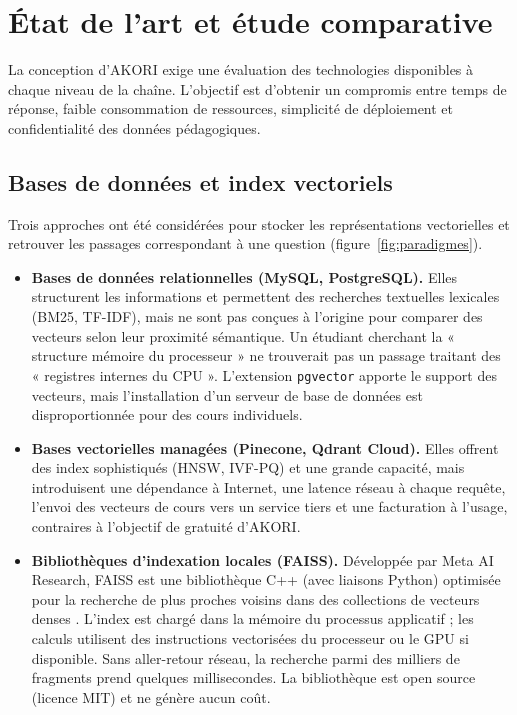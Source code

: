 \documentclass[12pt,a4paper,oneside]{report}
\begin{document}
\section{État de l'art et étude comparative}

La conception d'AKORI exige une évaluation des technologies disponibles à chaque niveau de la chaîne. L'objectif est d'obtenir un compromis entre temps de réponse, faible consommation de ressources, simplicité de déploiement et confidentialité des données pédagogiques.

\subsection{Bases de données et index vectoriels}

Trois approches ont été considérées pour stocker les représentations vectorielles et retrouver les passages correspondant à une question (figure~\ref{fig:paradigmes}).

\begin{itemize}
  \item \textbf{Bases de données relationnelles (MySQL, PostgreSQL).} Elles structurent les informations et permettent des recherches textuelles lexicales (BM25, TF-IDF), mais ne sont pas conçues à l'origine pour comparer des vecteurs selon leur proximité sémantique. Un étudiant cherchant la « structure mémoire du processeur » ne trouverait pas un passage traitant des « registres internes du CPU ». L'extension \texttt{pgvector} apporte le support des vecteurs, mais l'installation d'un serveur de base de données est disproportionnée pour des cours individuels.
  \item \textbf{Bases vectorielles managées (Pinecone, Qdrant Cloud).} Elles offrent des index sophistiqués (HNSW, IVF-PQ) et une grande capacité, mais introduisent une dépendance à Internet, une latence réseau à chaque requête, l'envoi des vecteurs de cours vers un service tiers et une facturation à l'usage, contraires à l'objectif de gratuité d'AKORI.
  \item \textbf{Bibliothèques d'indexation locales (FAISS).} Développée par Meta AI Research, FAISS est une bibliothèque C++ (avec liaisons Python) optimisée pour la recherche de plus proches voisins dans des collections de vecteurs denses \cite{johnson2021faiss,douze2024faiss}. L'index est chargé dans la mémoire du processus applicatif ; les calculs utilisent des instructions vectorisées du processeur ou le GPU si disponible. Sans aller-retour réseau, la recherche parmi des milliers de fragments prend quelques millisecondes. La bibliothèque est open source (licence MIT) et ne génère aucun coût.
\end{itemize}
\end{document}
